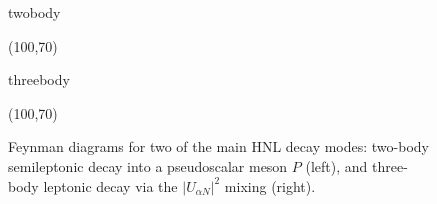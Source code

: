 \begin{figure}
	\centering
	\begin{fmffile}{twobody}
		\begin{fmfgraph*}(100,70)
		\end{fmfgraph*}
	\end{fmffile}
	\qquad\qquad
	\begin{fmffile}{threebody}
		\begin{fmfgraph*}(100,70)
		\end{fmfgraph*}
	\end{fmffile}

	\caption[Feynman diagrams for HNL decay two-body and three-body decays.]
	{Feynman diagrams for two of the main HNL decay modes: two-body semileptonic decay into a pseudoscalar meson $P$ (left), %
		and three-body leptonic decay via the $|U_{\alpha N}|^2$ mixing (right).
	}
	\label{fig:HNL_fyenman}
\end{figure}

